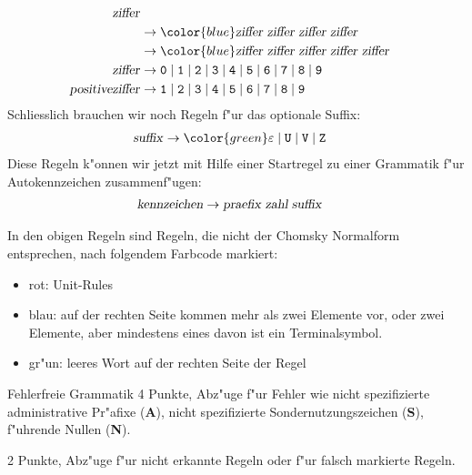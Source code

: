 \begin{loesung}
\begin{teilaufgaben}
\begin{align*}
{\text{\textsl{ziffer}}}
\\
&\rightarrow
{\color{blue}
\text{\textsl{ziffer}}\;
\text{\textsl{ziffer}}\;
\text{\textsl{ziffer}}\;
\text{\textsl{ziffer}}}
\\
&\rightarrow
{\color{blue}
\text{\textsl{ziffer}}\;
\text{\textsl{ziffer}}\;
\text{\textsl{ziffer}}\;
\text{\textsl{ziffer}}\;
\text{\textsl{ziffer}}}
\\
\text{\textsl{ziffer}}
&\rightarrow
{\tt 0}\;|\;
{\tt 1}\;|\;
{\tt 2}\;|\;
{\tt 3}\;|\;
{\tt 4}\;|\;
{\tt 5}\;|\;
{\tt 6}\;|\;
{\tt 7}\;|\;
{\tt 8}\;|\;
{\tt 9}
\\
\text{\textsl{positiveziffer}}
&\rightarrow
{\tt 1}\;|\;
{\tt 2}\;|\;
{\tt 3}\;|\;
{\tt 4}\;|\;
{\tt 5}\;|\;
{\tt 6}\;|\;
{\tt 7}\;|\;
{\tt 8}\;|\;
{\tt 9}
\\
\end{align*}
Schliesslich brauchen wir noch Regeln f"ur das optionale Suffix:
\begin{align*}
\text{\textsl{suffix}}
&\rightarrow{\color{green}\varepsilon} \;|\;
{\tt U} \;|\;
{\tt V} \;|\;
{\tt Z}
\end{align*}
Diese Regeln k"onnen wir jetzt mit Hilfe einer Startregel zu einer
Grammatik f"ur Autokennzeichen zusammenf"ugen:
\begin{align*}
\text{\textsl{kennzeichen}}&\rightarrow
\text{\textsl{praefix}}\;\text{\textsl{zahl}}\;\text{\textsl{suffix}}
\end{align*}
\item In den obigen Regeln sind Regeln, die nicht der Chomsky Normalform
entsprechen, nach folgendem Farbcode markiert:
\begin{itemize}
\item {\color{red} rot}: Unit-Rules
\item {\color{blue} blau}: auf der rechten Seite kommen mehr als
zwei Elemente vor, oder zwei Elemente, aber mindestens eines davon
ist ein Terminalsymbol.
\item {\color{green} gr"un}: leeres Wort auf der rechten Seite der Regel
\end{itemize}

\end{teilaufgaben}
\end{loesung}

\begin{bewertung}
\begin{teilaufgaben}
\item Fehlerfreie Grammatik 4 Punkte, Abz"uge f"ur Fehler wie
nicht spezifizierte administrative Pr"afixe ({\bf A}), nicht spezifizierte
Sondernutzungszeichen ({\bf S}), f"uhrende Nullen ({\bf N}).
\item 2 Punkte, Abz"uge f"ur nicht erkannte Regeln oder f"ur falsch
markierte Regeln.
\end{teilaufgaben}
\end{bewertung}

